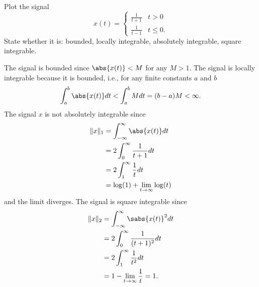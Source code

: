 \begin{excersizelist}
\item \label{exer:functionsquarenotabsint} Plot the signal 
\[
x(t) = \begin{cases}
\tfrac{1}{t+1} & t > 0 \\
\tfrac{1}{t-1} & t \leq 0.
\end{cases}
\]
State whether it is: bounded, locally integrable, absolutely integrable, square integrable.
\begin{solution}
\begin{center}
\end{center}
The signal is bounded since $\abs{x(t)} < M$ for any $M > 1$.  The signal is locally integrable because it is bounded, i.e., for any finite constants $a$ and $b$
\[
\int_{a}^b \abs{x(t)} dt < \int_{a}^b M dt = (b-a)M < \infty.
\]
The signal $x$ is not absolutely integrable since
\begin{align*}
\|x\|_1 &= \int_{-\infty}^\infty \abs{x(t)} dt \\
&= 2 \int_{0}^\infty \frac{1}{t+1} dt \\
&= 2 \int_{1}^\infty \frac{1}{t} dt \\
&= \log(1) + \lim_{t \to \infty} \log(t)
\end{align*}
and the limit diverges.  The signal is square integrable since
\begin{align*}
\|x\|_2 &= \int_{-\infty}^\infty \sabs{x(t)}^2 dt \\
&= 2 \int_{0}^\infty \frac{1}{(t+1)^2} dt \\
&= 2 \int_{1}^\infty \frac{1}{t^2} dt \\
&= 1 - \lim_{t \to \infty} \frac{1}{t} = 1.
\end{align*}
\end{solution}


\end{excersizelist}
